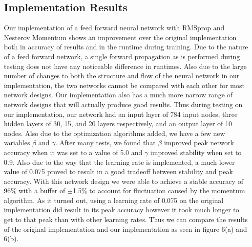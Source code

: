 \documentclass[12pt]{article}
\theoremstyle{definition}
\theoremstyle{plain}
\begin{document}
\subsection{Implementation Results}
Our implementation of a feed forward neural network with RMSprop and Nesterov Momentum\cite{readthedocs,ruder_2016} shows an improvement over the original implementation both in accuracy of results and in the runtime during training. Due to the nature of a feed forward network, a single forward propagation as is performed during testing does not have any noticeable difference in runtimes. Also due to the large number of changes to both the structure and flow of the neural network in our implementation, the two networks cannot be compared with each other for most network designs. Our implementation also has a much more narrow range of network designs that will actually produce good results. Thus during testing on our implementation, our network had an input layer of 784 input nodes, three hidden layers of 30, 15, and 20 layers respectively, and an output layer of 10 nodes. Also due to the optimization algorithms added, we have a few new variables $\beta$ and $\gamma$. After many tests, we found that $\beta$ improved peak network accuracy when it was set to a value of 5.0 and $\gamma$ improved stability when set to 0.9. Also due to the way that the learning rate is implemented, a much lower value of 0.075 proved to result in a good tradeoff between stability and peak accuracy. With this network design we were able to achieve a stable accuracy of 96\% with a buffer of $\pm$1.5\% to account for fluctuation caused by the momentum algorithm. As it turned out, using a learning rate of 0.075 on the original implementation did result in its peak accuracy however it took much longer to get to that peak than with other learning rates. Thus we can compare the results of the original implementation and our implementation as seen in figure 6(a) and 6(b). 
\end{document}
